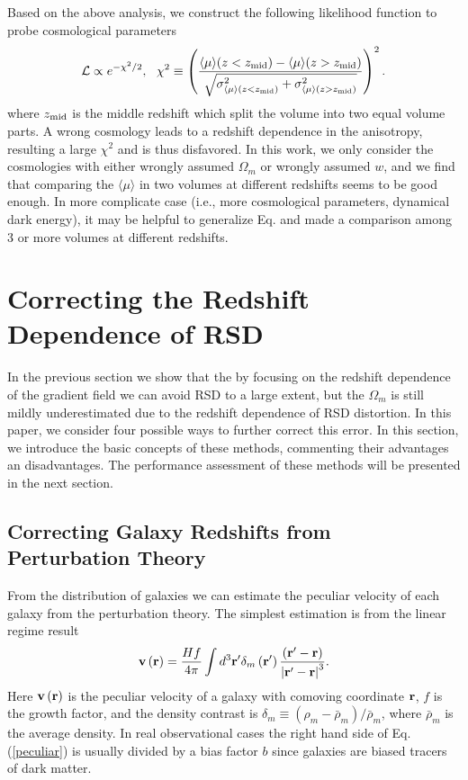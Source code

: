 \documentclass{emulateapj}
\begin{document}
Based on the above analysis, we construct the following likelihood function to probe cosmological parameters
\begin{equation}\label{eq:like}
 \mathcal{L}\propto e^{-\chi^2/2},\ \ \chi^2\equiv \left(\frac{\langle\mu\rangle(z<z_{\rm mid})-\langle\mu\rangle(z>z_{\rm mid})}
 {\sqrt{{\sigma}_{\langle\mu\rangle(z<z_{\rm mid})}^2+{\sigma}_{\langle\mu\rangle(z>z_{\rm mid})}^2}}\right)^2.
\end{equation}
where $z_{\rm mid}$ is the middle redshift which split the volume into two equal volume parts.
A wrong cosmology leads to a redshift dependence in the anisotropy,
resulting a large $\chi^2$ and is thus disfavored.
In this work, we only consider the cosmologies with either wrongly assumed $\Omega_m$ or wrongly assumed $w$,
and we find that comparing the $\langle\mu\rangle$ in two volumes at different redshifts seems to be good enough.
In more complicate case (i.e., more cosmological parameters, dynamical dark energy), 
it may be helpful to generalize Eq. \label{eq:like} and made a comparison among 3 or more volumes at different redshifts.

\section{Correcting the Redshift Dependence of RSD}

In the previous section we show that the by focusing on the redshift dependence of the gradient field we can avoid RSD to a large extent,
but the $\Omega_m$ is still mildly underestimated due to the redshift dependence of RSD distortion.
In this paper, we consider four possible ways to further correct this error.
In this section, we introduce the basic concepts of these methods, commenting their advantages an disadvantages.
The performance assessment of these methods will be presented in the next section.

\subsection{Correcting Galaxy Redshifts from Perturbation Theory}
 
From the distribution of galaxies we can estimate the peculiar velocity of each galaxy from the perturbation theory.
The simplest estimation is from the linear regime result
\begin{equation}
  {\bf{v}}\left( {\bf{r}} \right) =
\frac{Hf}{4\pi }\int d^3 {\bf{r}}^{\prime
} \delta_{m}\left( \mathbf{r}^{\prime }\right) \frac{\left( \mathbf{r}^{\prime
}-\mathbf{r}\right) }{\left| \mathbf{r}^{\prime }-\mathbf{r}\right| ^3}.
\label{peculiar}
\end{equation}
Here ${\bf v}\left( {\bf{r}} \right)$ is the peculiar velocity of a galaxy with comoving coordinate $\bf r$,
$f$ is the growth factor, 
and the density contrast is $\delta_{m}\equiv (\rho_m-\bar{\rho}_m)/\bar{\rho}_m$,
where $\bar{\rho}_m$ is the average density.
In real observational cases the right hand side of Eq. (\ref{peculiar})
is usually divided by a bias factor $b$ since galaxies are biased tracers of dark matter.
\end{document}
